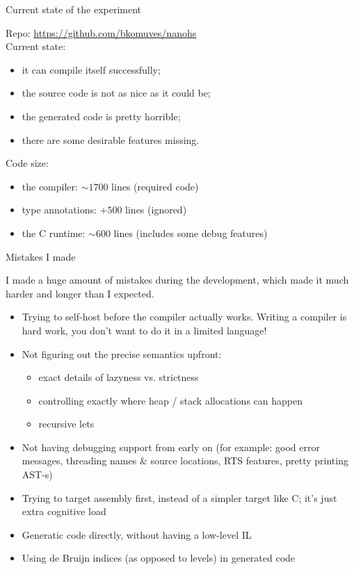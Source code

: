 \documentclass{beamer}
\begin{document}

\begin{frame}{Current state of the experiment}

Repo: \url{https://github.com/bkomuves/nanohs}\\[15pt]

Current state:
\begin{itemize}
\item it can compile itself successfully;
\item the source code is not as nice as it could be;
\item the generated code is pretty horrible;
\item there are some desirable features missing.\\[15pt]
\end{itemize}

Code size:
\begin{itemize}
\item the compiler: $\sim 1700$ lines (required code)
\item type annotations: $+500$ lines (ignored)
\item the C runtime: $\sim 600$ lines (includes some debug features)
\end{itemize}

\end{frame}


\begin{frame}{Mistakes I made}

{\small
I made a huge amount of mistakes during the development, which made it much
harder and longer than I expected.

\begin{itemize}
\item Trying to self-host before the compiler actually works. Writing a 
compiler is hard work, you don't want to do it in a limited language!
\item Not figuring out the precise semantics upfront:
   \begin{itemize}
   \item exact details of lazyness vs. strictness
   \item controlling exactly where heap / stack allocations can happen
   \item recursive lets
   \end{itemize}
\item Not having debugging support from early on (for example: good error messages, 
      threading names \& source locations, RTS features, pretty printing AST-s)
\item Trying to target assembly first, instead of a simpler target like C; it's just extra cognitive load
\item Generatic code directly, without having a low-level IL
\item Using de Bruijn indices (as opposed to levels) in generated code
\end{itemize}
}

\end{frame}
\end{document}

